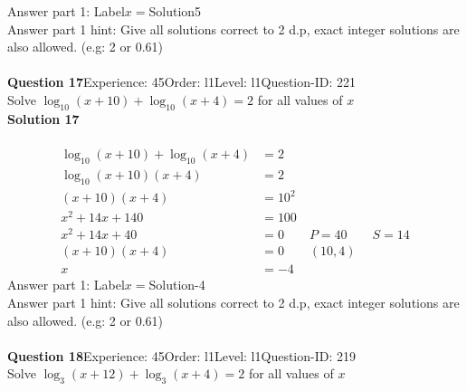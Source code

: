 \documentclass{article}
\begin{document}
Answer part 1: \hspace{10pt}Label\hspace{10pt}$x=$\hspace{10pt}Solution\hspace{10pt}5\\
Answer part 1 hint: \hspace{15pt}Give all solutions correct to 2 d.p, exact integer solutions are also allowed. (e.g: 2 or 0.61)\\
\\[4pt]
\noindent\textbf{Question 17}\hspace{20pt}Experience: 45\hspace{20pt}Order: l1\hspace{20pt}Level: l1\hspace{20pt}Question-ID: 221\\[2pt]
Solve $\log_{10}(x+10)+\log_{10}(x+4)=2$ for all values of $x$\\[4pt]
\noindent\textbf{Solution 17}\\[2pt]
\\[-35pt]\begin{align*}
\log_{10}(x+10)+\log_{10}(x+4)&=2\\[2pt]
\log_{10}(x+10)(x+4)&=2\\[2pt]
(x+10)(x+4)&=10^2\\[2pt]
x^2+14x+140&=100\\[2pt]
x^2+14x+40&=0\qquad P=40 \qquad S=14\\[2pt]
(x+10)(x+4)&=0\qquad (10,4)\\[2pt]
x&=-4
\end{align*}
Answer part 1: \hspace{10pt}Label\hspace{10pt}$x=$\hspace{10pt}Solution\hspace{10pt}-4\\
Answer part 1 hint: \hspace{15pt}Give all solutions correct to 2 d.p, exact integer solutions are also allowed. (e.g: 2 or 0.61)\\
\\[4pt]
\noindent\textbf{Question 18}\hspace{20pt}Experience: 45\hspace{20pt}Order: l1\hspace{20pt}Level: l1\hspace{20pt}Question-ID: 219\\[2pt]
Solve $\log_{3}(x+12)+\log_{3}(x+4)=2$ for all values of $x$\\[4pt]
\end{document}
